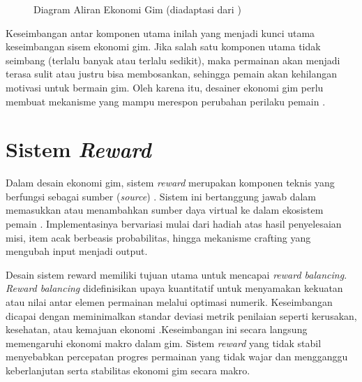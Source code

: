 \begin{figure}[htbp]
\caption*{\textbf{Keterangan:} Angka pada panah menunjukkan bobot aliran sumber daya. 
Tanda + berarti penambahan, - berarti pengurangan, desimal (0.3) menunjukkan probabilitas 30\%.}
\caption{Diagram Aliran Ekonomi Gim (diadaptasi dari \cite{Rupp_2024})}
\label{fig:game_economy}
\end{figure}

Keseimbangan antar komponen utama inilah yang menjadi kunci utama keseimbangan sisem ekonomi gim. Jika salah satu komponen utama tidak seimbang (terlalu banyak atau terlalu sedikit), maka permainan akan menjadi terasa sulit atau justru bisa membosankan, sehingga pemain akan kehilangan motivasi untuk bermain gim. Oleh karena itu, desainer ekonomi gim perlu membuat mekanisme yang mampu merespon perubahan perilaku pemain \citep{BowmanKeeneNajera2021}.

\section{Sistem \textit{Reward}}\label{}
Dalam desain ekonomi gim, sistem \textit{reward} merupakan komponen teknis yang berfungsi sebagai sumber (\textit{source}) . Sistem ini bertanggung jawab dalam memasukkan atau menambahkan sumber daya virtual ke dalam ekosistem pemain \citep{RanandehMirzaBabaei2023}. Implementasinya bervariasi mulai dari hadiah atas hasil penyelesaian misi, item acak berbeasis probabilitas, hingga mekanisme crafting yang mengubah input menjadi output. 

Desain sistem reward memiliki tujuan utama untuk mencapai \textit{reward balancing}. \textit{Reward balancing} didefinisikan upaya kuantitatif untuk menyamakan kekuatan atau nilai antar elemen permainan melalui optimasi numerik. Keseimbangan dicapai dengan meminimalkan standar deviasi metrik penilaian seperti kerusakan, kesehatan, atau kemajuan ekonomi \citep{9750161}.Keseimbangan ini secara langsung memengaruhi ekonomi makro dalam gim. Sistem \textit{reward} yang tidak stabil menyebabkan percepatan progres permainan yang tidak wajar dan mengganggu keberlanjutan serta stabilitas ekonomi gim secara makro.

